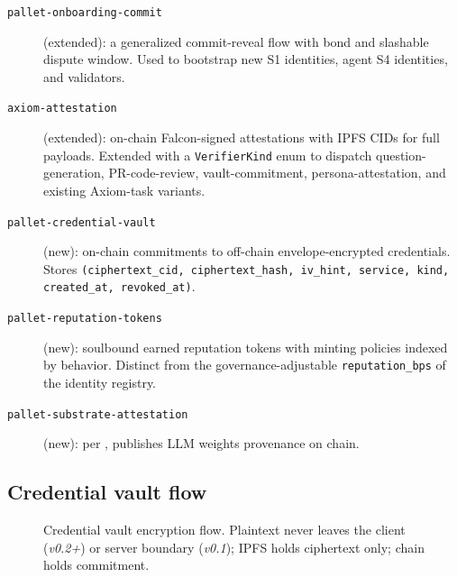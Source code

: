\documentclass[11pt,a4paper,parskip=half-,DIV=12,headings=standardclasses]{scrartcl}
\theoremstyle{ncthm}
\theoremstyle{ncdef}
\newcommand{\Hash}{\mathsf{H}}
\begin{document}
\begin{description}
\item[\texttt{pallet-onboarding-commit}] (extended): a generalized
  commit-reveal flow with bond and slashable dispute window. Used to
  bootstrap new S1 identities, agent S4 identities, and validators.
\item[\texttt{axiom-attestation}] (extended): on-chain Falcon-signed
  attestations with IPFS CIDs for full payloads. Extended with a
  \texttt{VerifierKind} enum to dispatch question-generation,
  PR-code-review, vault-commitment, persona-attestation, and existing
  Axiom-task variants.
\item[\texttt{pallet-credential-vault}] (new): on-chain commitments to
  off-chain envelope-encrypted credentials. Stores
  \texttt{(ciphertext\_cid, ciphertext\_hash, iv\_hint, service, kind,
  created\_at, revoked\_at)}.
\item[\texttt{pallet-reputation-tokens}] (new): soulbound earned
  reputation tokens with minting policies indexed by behavior. Distinct
  from the governance-adjustable \texttt{reputation\_bps} of the
  identity registry.
\item[\texttt{pallet-substrate-attestation}] (new): per
  , publishes LLM weights provenance on chain.
\end{description}

\subsection{Credential vault flow}

\begin{figure}[h]
\centering
{}
\caption{Credential vault encryption flow. Plaintext never leaves the
client (\emph{v0.2+}) or server boundary (\emph{v0.1}); IPFS holds
ciphertext only; chain holds commitment.}
\label{fig:vault-flow}
\end{figure}
\end{document}
